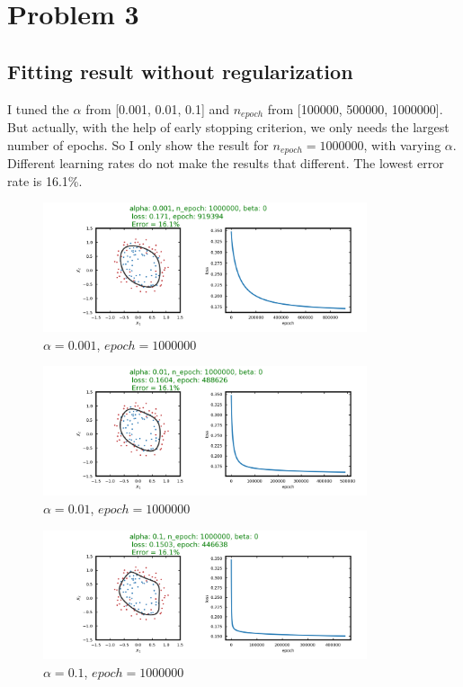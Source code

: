 \section{Problem 3}

\subsection{Fitting result without regularization}

I tuned the $\alpha$ from [0.001, 0.01, 0.1] and $n_{epoch}$ from [100000, 500000, 1000000]. But actually, with the help of early stopping criterion, we only needs the largest number of epochs. So I only show the result for $n_{epoch} = 1000000$, with varying $\alpha$. Different learning rates do not make the results that different. The lowest error rate is 16.1\%.

\begin{figure}[H]
\centering
  \includegraphics[width=0.85\textwidth]{fig/prob3/alpha_0_001_n_epoch1000000_beta_0.png}
\centering 
\caption{\protect $\alpha = 0.001$, $epoch = 1000000$}
\label{fig:15th}
\end{figure}

\begin{figure}[H]
\centering
  \includegraphics[width=0.85\textwidth]{fig/prob3/alpha_0_01_n_epoch1000000_beta_0.png}
\centering 
\caption{\protect $\alpha = 0.01$, $epoch = 1000000$}
\label{fig:15th}
\end{figure}

\begin{figure}[H]
\centering
  \includegraphics[width=0.85\textwidth]{fig/prob3/alpha_0_1_n_epoch1000000_beta_0.png}
\centering 
\caption{\protect $\alpha = 0.1$, $epoch = 1000000$}
\label{fig:15th}
\end{figure}

